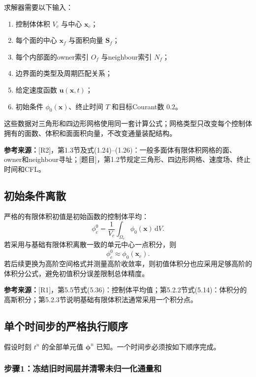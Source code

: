 \documentclass[UTF8,12pt,a4paper]{ctexart}
\numberwithin{equation}{section}
\newcommand{\Rone}{\textnormal{[R1]}}
\newcommand{\Rtwo}{\textnormal{[R2]}}
\newcommand{\Task}{\textnormal{[题目]}}
\newcommand{\source}[1]{%
  \par\smallskip
  \noindent\colorbox{sourcebg}{%
    \parbox{0.955\linewidth}{\footnotesize\color{sourcegray}\textbf{参考来源：}#1}%
  }
  \par\smallskip
}
\newcommand{\dd}{\,\mathrm d}
\newcommand{\phiv}{\bm\phi}
\begin{document}
求解器需要以下输入：
\begin{enumerate}
  \item 控制体体积 $V_c$ 与中心 $\bm x_c$；
  \item 每个面的中心 $\bm x_f$ 与面积向量 $\bm S_f$；
  \item 每个内部面的owner索引 $O_f$ 与neighbour索引 $N_f$；
  \item 边界面的类型及周期匹配关系；
  \item 给定速度函数 $\bm u(\bm x,t)$；
  \item 初始条件 $\phi_0(\bm x)$、终止时间 $T$ 和目标Courant数 $0.2$。
\end{enumerate}

这些数据对三角形和四边形网格使用同一套计算公式；网格类型只改变每个控制体拥有的面数、体积和面面积向量，不改变通量装配结构。

\source{\Rtwo，第1.3节及式(1.24)--(1.26)：一般多面体有限体积网格的面、owner和neighbour寻址；\Task，第1.2节规定三角形、四边形网格、速度场、终止时间和CFL。}

\subsection{初始条件离散}

严格的有限体积初值是初始函数的控制体平均：
\begin{equation}
  \boxed{
  \phi_c^0
  =\frac{1}{V_c}\int_{\Omega_c}\phi_0(\bm x)\dd V
  }.
  \label{eq:initial_average}
\end{equation}
若采用与基础有限体积离散一致的单元中心一点积分，则
\begin{equation}
  \phi_c^0\approx\phi_0(\bm x_c).
  \label{eq:initial_midpoint}
\end{equation}
若后续更换为高阶空间格式并测量高阶收敛率，则初值体积分也应采用足够高阶的体积分公式，避免初值积分误差限制总体精度。

\source{\Rone，第5.5节式(5.36)：控制体平均值；第5.2.2节式(5.14)：体积分的高斯积分；第5.2.3节说明基础有限体积法通常采用一个积分点。}

\subsection{单个时间步的严格执行顺序}

假设时刻 $t^n$ 的全部单元值 $\phiv^n$ 已知。一个时间步必须按如下顺序完成。

\subsubsection*{步骤1：冻结旧时间层并清零未归一化通量和}
\end{document}
